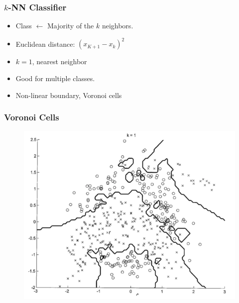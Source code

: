 \documentclass[a4,xcolor=dvipsnames]{beamer}
\begin{document}
\begin{frame}
    \frametitle{$k$-NN Classifier}
    \begin{itemize}
        \item Class $\leftarrow$ Majority of the $k$ neighbors.
        \item Euclidean distance: $(x_{K+1}-x_{k})^2$
        \item $k=1$, nearest neighbor
        \item Good for multiple classes.
        \item Non-linear boundary, Voronoi cells
    \end{itemize}
\end{frame}
\begin{frame}
    \frametitle{Voronoi Cells}
\begin{figure}
    \centering
    \includegraphics[width=.6\textwidth]{voronoi.png}
\end{figure}
\end{frame}
\end{document}
